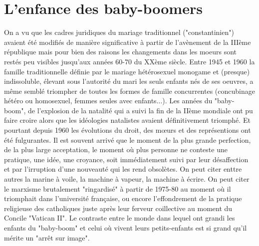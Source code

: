 

 
 \chapter{L'enfance des baby-boomers}
 
  On a vu que les cadres juridiques du mariage traditionnel ("constantinien") avaient été modifiés de manière significative à partir de l'avènement de la IIIème république mais pour bien des raisons les changements dans les moeurs sont restés peu visibles jusqu'aux années 60-70 du XXème siècle. Entre 1945 et 1960 la famille traditionnelle définie par le mariage hétérosexuel monogame et (presque) indissoluble, élevant sous l'autorité du mari les seuls enfants nés de ses oeuvres, a même semblé triompher  de toutes les formes de famille concurrentes (concubinage hétéro ou homosexuel, femmes seules avec enfants...). Les années du "baby-boom", de l'explosion de la natalité qui a suivi la fin de la IIème mondiale ont pu faire croire alors que les idéologies natalistes avaient définitivement triomphé. Et pourtant depuis 1960 les évolutions du droit, des mœurs et des représentions ont été fulgurantes. Il est souvent arrivé que le moment de la plus grande perfection, de la plus large acceptation, le moment où plus personne ne conteste une pratique, une idée, une croyance, soit immédiatement suivi par leur désaffection et par l'irruption d'une nouveauté qui les rend obsolètes. On peut citer enttre autres la marine à voile, la machine à vapeur, la machine à écrire. On peut citer le marxisme brutalement "ringardisé" à partir de 1975-80 au moment où il triomphait dans l'université française, ou encore l'effondrement de la pratique religieuse des catholiques juste après leur ferveur coillective au moment du Concile "Vatican II". Le contraste entre  le monde dans lequel ont grandi les enfants du "baby-boom" et celui où vivent leurs petits-enfants est si grand qu'il mérite un "arrêt sur image". 
  
